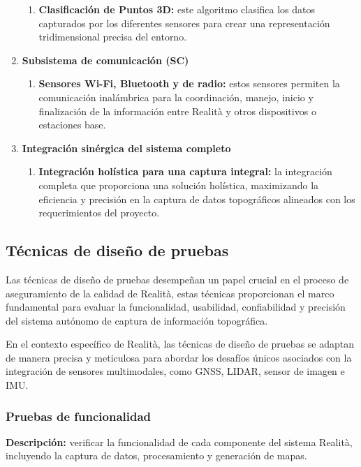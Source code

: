 \documentclass[12pt,a4paper, twoside]{article} %
\begin{document}
\begin{enumerate}
\begin{enumerate}
\item \textbf{Clasificación de Puntos 3D:} este algoritmo clasifica los datos capturados por los diferentes sensores para crear una representación tridimensional precisa del entorno.
\end{enumerate}

\item \textbf{Subsistema de comunicación (SC)}
\begin{enumerate}
\item \textbf{Sensores Wi-Fi, Bluetooth y de radio:} estos sensores permiten la comunicación inalámbrica para la coordinación, manejo, inicio y finalización de la información entre Realità y otros dispositivos o estaciones base.
\end{enumerate}

\item \textbf{Integración sinérgica del sistema completo}
\begin{enumerate}
\item \textbf{Integración holística para una captura integral:} la integración completa que proporciona una solución holística, maximizando la eficiencia y precisión en la captura de datos topográficos alineados con los requerimientos del proyecto.
\end{enumerate}

\end{enumerate}


\subsection{Técnicas de diseño de pruebas}

Las técnicas de diseño de pruebas desempeñan un papel crucial en el proceso de aseguramiento de la calidad de Realità, estas técnicas proporcionan el marco fundamental para evaluar la funcionalidad, usabilidad, confiabilidad y precisión del sistema autónomo de captura de información topográfica.

En el contexto específico de Realità, las técnicas de diseño de pruebas se adaptan de manera precisa y meticulosa para abordar los desafíos únicos asociados con la integración de sensores multimodales, como GNSS, LIDAR, sensor de imagen e IMU.

\subsubsection{Pruebas de funcionalidad}

\textbf{Descripción:} verificar la funcionalidad de cada componente del sistema Realità, incluyendo la captura de datos, procesamiento y generación de mapas.
\end{document}
